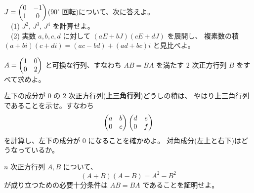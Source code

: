 \begin{mondai}[発展]\label{q:matmul-ex9}
$J = \begin{pmatrix}0 & -1 \\ 1 & 0\end{pmatrix}$($90^\circ$ 回転)について、次に答えよ。\\
　(1) $J^2$, $J^3$, $J^4$ を計算せよ。\\
　(2) 実数 $a, b, c, d$ に対して $(aE + bJ)(cE + dJ)$ を展開し、
複素数の積 $(a + bi)(c + di) = (ac - bd) + (ad + bc)i$ と見比べよ。
\end{mondai}

\begin{mondai}[発展]\label{q:matmul-ex10}
$A = \begin{pmatrix}1 & 0 \\ 0 & 2\end{pmatrix}$ と可換な行列、すなわち $AB = BA$ を満たす
$2$ 次正方行列 $B$ をすべて求めよ。
\end{mondai}

\begin{mondai}[証明]\label{q:matmul-ex11}
左下の成分が $0$ の $2$ 次正方行列(\textbf{上三角行列})どうしの積は、
やはり上三角行列であることを示せ。すなわち
\[
\begin{pmatrix}a & b \\ 0 & c\end{pmatrix}\begin{pmatrix}d & e \\ 0 & f\end{pmatrix}
\]
を計算し、左下の成分が $0$ になることを確かめよ。
対角成分(左上と右下)はどうなっているか。
\end{mondai}

\begin{mondai}[証明]\label{q:matmul-ex12}
$n$ 次正方行列 $A, B$ について、
\[
(A + B)(A - B) = A^2 - B^2
\]
が成り立つための必要十分条件は $AB = BA$ であることを証明せよ。
\end{mondai}

